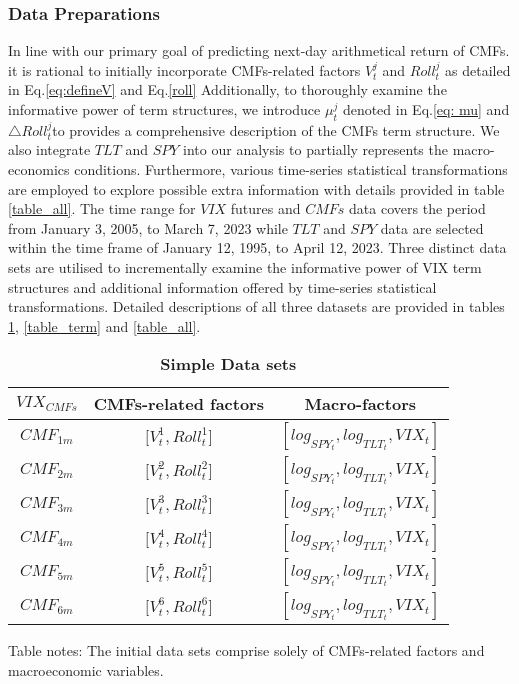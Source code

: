 \documentclass[10pt,letterpaper]{article}
\begin{document}
\subsubsection*{Data Preparations}
In line with our primary goal of predicting next-day arithmetical return of CMFs. it is rational to initially incorporate CMFs-related factors \(V^j_t\) and \(Roll^j_{t}\) as detailed in Eq.\ref{eq:defineV} and Eq.\ref{roll} Additionally, to thoroughly examine the informative power of term structures, we introduce \(\mu^j_t\) denoted in Eq.\ref{eq: mu} and  \(\triangle Roll_{t}^j\)to provides a comprehensive description of the CMFs term structure. We also integrate \(TLT\) and \(SPY\) into our analysis to partially represents the macro-economics conditions. Furthermore, various time-series statistical transformations are employed to explore possible extra information with details provided in table \ref{table_all}. The time range for \(VIX\)  futures and \(CMFs\)  data covers the period from January 3, 2005, to March 7, 2023 while \(TLT\)  and \(SPY\)  data are selected within the time frame of January 12, 1995, to April 12, 2023. Three distinct data sets are utilised to incrementally examine the informative power of VIX term structures and additional information offered by time-series statistical transformations.
Detailed descriptions of all three datasets are provided in tables \ref{table_simple}, \ref{table_term} and \ref{table_all}.
\begin{table}[!ht]
\centering
\caption{
{\bf Simple Data sets}}
\begin{tabular}{|c|c|c|} %
    \hline %
    \(VIX_{CMFs}\)  & CMFs-related factors & Macro-factors \\
    \hline %
    \(CMF_{1m}\)  & \({[V_{t}^1},{Roll_{t}^1]}\) & \([log_{SPY_t},log_{TLT_t},VIX_t]\) \\
    \hline
    \(CMF_{2m}\)  & \({[V_{t}^2},{Roll_{t}^2]}\)  & \([log_{SPY_t},log_{TLT_t},VIX_t]\) \\
    \hline
    \(CMF_{3m}\)  & \({[V_{t}^3},{Roll_{t}^3]}\) & \([log_{SPY_t},log_{TLT_t},VIX_t]\) \\
    \hline
    \(CMF_{4m}\)& \({[V_{t}^4},{Roll_{t}^4]}\) & \([log_{SPY_t},log_{TLT_t},VIX_t]\)\\
    \hline
    \(CMF_{5m}\) &  \({[V_{t}^5},{Roll_{t}^5]}\) & \([log_{SPY_t},log_{TLT_t},VIX_t]\) \\
    \hline
    \(CMF_{6m}\) & \({[V_{t}^6},{Roll_{t}^6]}\) & \([log_{SPY_t},log_{TLT_t},VIX_t]\) \\
    \hline %
  \end{tabular}
\begin{flushleft} Table notes: The initial data sets comprise solely of CMFs-related factors and macroeconomic variables.
\end{flushleft}
\label{table_simple}
\end{table}
\end{document}

